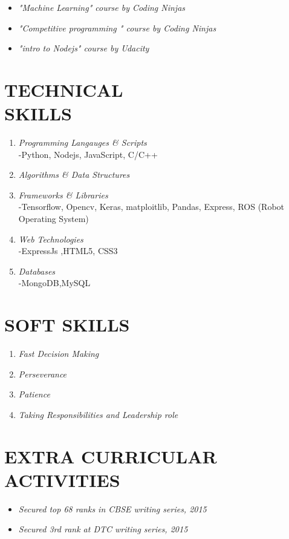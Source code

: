\documentclass[margin]{res}
\begin{document}
\begin{enumerate}
\begin{itemize}
 \item{\sl  "Machine Learning" course by Coding Ninjas }
 \item{\sl  "Competitive programming " course by Coding Ninjas}
 \item{\sl  "intro to Nodejs" course by Udacity}
 \end{itemize}

\section{TECHNICAL  \\ SKILLS} \begin{enumerate}
\item {\sl Programming Langauges \& Scripts }\\
	-Python, Nodejs, JavaScript, C/C++
\item {\sl Algorithms \& Data Structures }\\
\item {\sl Frameworks \& Libraries}\\
	-Tensorflow, Opencv, Keras, matploitlib, Pandas, Express, ROS (Robot Operating System)
\item {\sl Web Technologies}\\
	-ExpressJs ,HTML5, CSS3 
\item{\sl Databases}\\
	-MongoDB,MySQL
\end{enumerate}



\section{SOFT SKILLS }\begin{enumerate}
\item{\sl Fast Decision Making }
\item{\sl Perseverance}
\item{\sl Patience}
\item{\sl Taking Responsibilities and Leadership role}
\end{enumerate}

\section{EXTRA CURRICULAR ACTIVITIES}\begin{itemize}
\item{\sl Secured top 68 ranks in CBSE writing series, 2015}
\item{\sl Secured 3rd rank at DTC writing series, 2015}


\end{itemize}
\end{enumerate}
\end{document}
